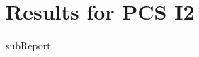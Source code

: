 \renewcommand{\DTRPcs}{I2} %
\renewcommand{\DTRPcsLong}{I2}


    \section{Results for PCS \DTRPcsLong}

    {{subReport}}
    \newpage


